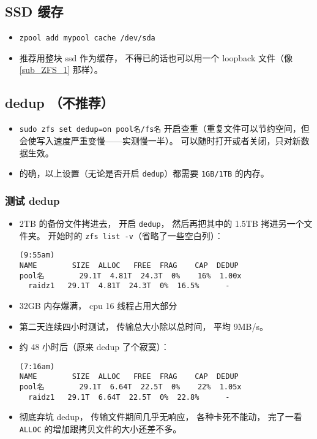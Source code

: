 \subsection{SSD 缓存}
\begin{itemize}
\item \verb`zpool add mypool cache /dev/sda`
\item 推荐用整块 ssd 作为缓存， 不得已的话也可以用一个 loopback 文件（像\autoref{sub_ZFS_1} 那样）。
\end{itemize}

\subsection{dedup （不推荐）}
\begin{itemize}
\item \verb`sudo zfs set dedup=on pool名/fs名` 开启查重（重复文件可以节约空间，但会使写入速度严重变慢——实测慢一半）。 可以随时打开或者关闭，只对新数据生效。
\item 的确，以上设置（无论是否开启 \verb`dedup`）都需要 \verb`1GB/1TB` 的内存。
\end{itemize}

\subsubsection{测试 dedup}
\begin{itemize}
\item 2TB 的备份文件拷进去， 开启 \verb`dedup`， 然后再把其中的 1.5TB 拷进另一个文件夹。 开始时的 \verb`zfs list -v`（省略了一些空白列）：
\begin{lstlisting}[language=none]
(9:55am)
NAME        SIZE  ALLOC   FREE  FRAG    CAP  DEDUP
pool名        29.1T  4.81T  24.3T  0%    16%  1.00x
  raidz1   29.1T  4.81T  24.3T  0%  16.5%      -
\end{lstlisting}
\item 32GB 内存爆满， cpu 16 线程占用大部分
\item 第二天连续四小时测试， 传输总大小除以总时间， 平均 9MB/s。
\item 约 48 小时后（原来 dedup 了个寂寞）：
\begin{lstlisting}[language=none]
(7:16am)
NAME        SIZE  ALLOC   FREE  FRAG    CAP  DEDUP 
pool名        29.1T  6.64T  22.5T  0%    22%  1.05x   
  raidz1   29.1T  6.64T  22.5T  0%  22.8%      - 
\end{lstlisting}
\item 彻底弃坑 dedup， 传输文件期间几乎无响应， 各种卡死不能动， 完了一看 \verb`ALLOC` 的增加跟拷贝文件的大小还差不多。
\end{itemize}
